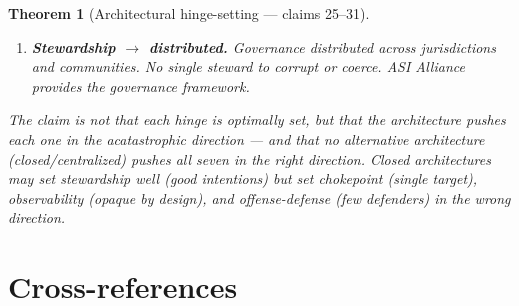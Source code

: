 \documentclass[11pt,a4paper]{article}
\newtheorem{theorem}[definition]{Theorem}
\begin{document}
\begin{theorem}[Architectural hinge-setting --- claims 25--31]
\begin{enumerate}
\item \textbf{Stewardship $\to$ distributed.} Governance
  distributed across jurisdictions and communities. No single
  steward to corrupt or coerce. ASI Alliance provides the
  governance framework.
\end{enumerate}

The claim is not that each hinge is optimally set, but that the
architecture pushes each one in the acatastrophic direction ---
and that no alternative architecture (closed/centralized) pushes
\emph{all seven} in the right direction. Closed architectures
may set stewardship well (good intentions) but set chokepoint
(single target), observability (opaque by design), and
offense-defense (few defenders) in the wrong direction.
\end{theorem}


\section{Cross-references}
\end{document}
